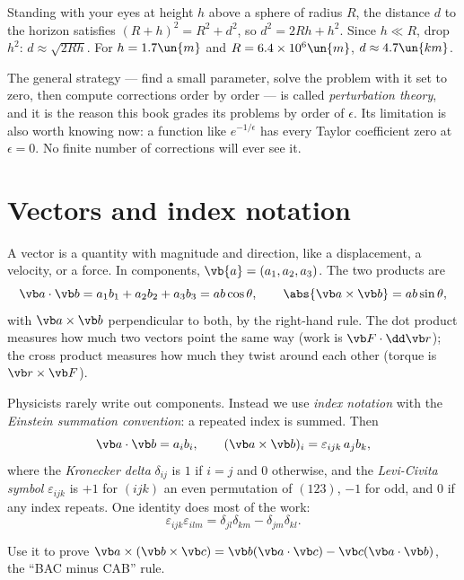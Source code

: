 \begin{example}
Standing with your eyes at height $h$ above a sphere of radius $R$, the distance $d$ to the horizon satisfies $(R+h)^2 = R^2 + d^2$, so $d^2 = 2Rh + h^2$. Since $h \ll R$, drop $h^2$: $d \approx \sqrt{2Rh}$. For $h=1.7\un{m}$ and $R = 6.4\times10^{6}\un{m}$, $d\approx 4.7\un{km}$.
\end{example}

The general strategy --- find a small parameter, solve the problem with it set to zero, then compute corrections order by order --- is called \emph{perturbation theory}, and it is the reason this book grades its problems by order of $\epsilon$. Its limitation is also worth knowing now: a function like $e^{-1/\epsilon}$ has every Taylor coefficient zero at $\epsilon=0$. No finite number of corrections will ever see it.

\section{Vectors and index notation}

A vector is a quantity with magnitude and direction, like a displacement, a velocity, or a force. In components, $\vb{a} = (a_1,a_2,a_3)$. The two products are
\[
  \vb a\cdot\vb b = a_1b_1 + a_2b_2+a_3b_3 = ab\cos\theta,
  \qquad
  \abs{\vb a \times \vb b} = ab\sin\theta,
\]
with $\vb a\times \vb b$ perpendicular to both, by the right-hand rule. The dot product measures how much two vectors point the same way (work is $\vb F\cdot\dd\vb r$); the cross product measures how much they twist around each other (torque is $\vb r\times\vb F$).

Physicists rarely write out components. Instead we use \emph{index notation} with the \emph{Einstein summation convention}: a repeated index is summed. Then
\[
  \vb a\cdot\vb b = a_i b_i, \qquad (\vb a\times\vb b)_i = \varepsilon_{ijk}\,a_j b_k,
\]
where the \emph{Kronecker delta} $\delta_{ij}$ is $1$ if $i=j$ and $0$ otherwise, and the \emph{Levi-Civita symbol} $\varepsilon_{ijk}$ is $+1$ for $(ijk)$ an even permutation of $(123)$, $-1$ for odd, and $0$ if any index repeats. One identity does most of the work:
\[
  \varepsilon_{ijk}\varepsilon_{ilm} = \delta_{jl}\delta_{km} - \delta_{jm}\delta_{kl}.
\]

\begin{exercise}
Use it to prove $\vb a\times(\vb b\times\vb c) = \vb b(\vb a\cdot\vb c) - \vb c(\vb a\cdot\vb b)$, the ``BAC minus CAB'' rule.
\end{exercise}

